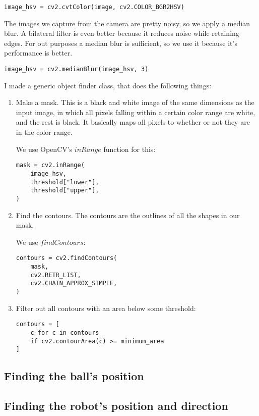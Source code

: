 \documentclass[12pt, a4paper]{article}
\begin{document}
\begin{lstlisting}
image_hsv = cv2.cvtColor(image, cv2.COLOR_BGR2HSV)
\end{lstlisting}

The images we capture from the camera are pretty noisy, so we apply a median blur. A bilateral filter is even better because it reduces noise while retaining edges. For out purposes a median blur is sufficient, so we use it because it's performance is better. \cite{openCVImageSmoothing}

\begin{lstlisting}
image_hsv = cv2.medianBlur(image_hsv, 3)
\end{lstlisting}

I made a generic object finder class, that does the following things:
\begin{enumerate}
	\item Make a mask. This is a black and white image of the same dimensions as the input image, in which all pixels falling within a certain color range are white, and the rest is black. It basically maps all pixels to whether or not they are in the color range.

	We use OpenCV's $inRange$ function for this:

	\begin{lstlisting}
mask = cv2.inRange(
	image_hsv,
	threshold["lower"],
	threshold["upper"],
)
	\end{lstlisting}
	\item Find the contours. The contours are the outlines of all the shapes in our mask.

	We use $findContours$:

	\begin{lstlisting}
contours = cv2.findContours(
	mask,
	cv2.RETR_LIST,
	cv2.CHAIN_APPROX_SIMPLE,
)
	\end{lstlisting}
	\item Filter out all contours with an area below some threshold:

	\begin{lstlisting}
contours = [
	c for c in contours
	if cv2.contourArea(c) >= minimum_area
]
	\end{lstlisting}
\end{enumerate}

\subsection{Finding the ball's position}

\subsection{Finding the robot's position and direction}
\end{document}
